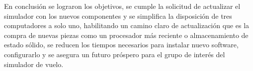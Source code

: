 En conclusión se lograron los objetivos, se cumple la solicitud de actualizar el simulador con los nuevos componentes y se simplifica la disposición de tres computadores a solo uno, habilitando un camino claro de actualización que es la compra de nuevas piezas como un procesador más reciente o almacenamiento de estado sólido, se reducen los tiempos necesarios para instalar nuevo software, configurarlo y se asegura un futuro próspero para el grupo de interés del simulador de vuelo.